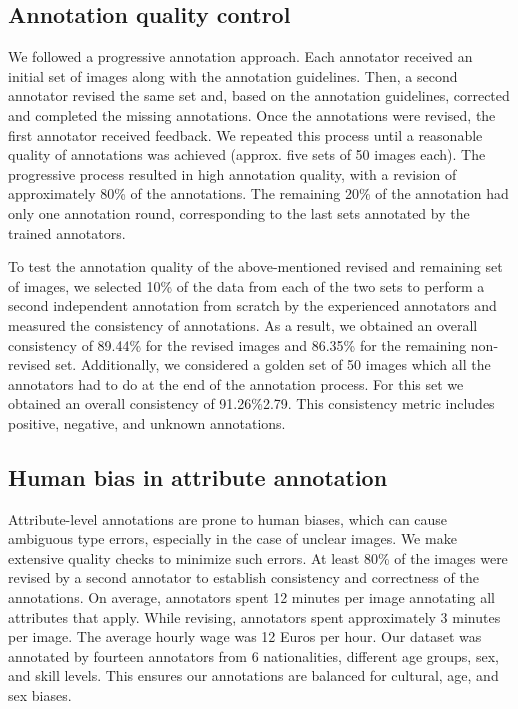 \documentclass[10pt,twocolumn,letterpaper]{article}
\begin{document}
\subsection{Annotation quality control}
We followed a progressive annotation approach. Each annotator received an initial set of images along with the annotation guidelines. Then, a second annotator revised the same set and, based on the annotation guidelines, corrected and completed the missing annotations. Once the annotations were revised, the first annotator received feedback. We repeated this process until a reasonable quality of annotations was achieved (approx. five sets of 50 images each). The progressive process resulted in high annotation quality, with a revision of approximately 80\% of the annotations. The remaining 20\% of the annotation had only one annotation round, corresponding to the last sets annotated by the trained annotators. 

To test the annotation quality of the above-mentioned revised and remaining set of images, we selected 10\% of the data from each of the two sets to perform a second independent annotation from scratch by the experienced annotators and measured the consistency of annotations. As a result, we obtained an overall consistency of 89.44\% for the revised images and 86.35\% for the remaining non-revised set. Additionally, we considered a golden set of 50 images which all the annotators had to do at the end of the annotation process. For this set we obtained an overall consistency of 91.26\%2.79. This consistency metric includes positive, negative, and unknown annotations. 


\subsection{Human bias in attribute annotation} 
Attribute-level annotations are prone to human biases, which can cause ambiguous type errors, especially in the case of unclear images. We make extensive quality checks to minimize such errors. At least 80\% of the images were revised by a second annotator to establish consistency and correctness of the annotations. On average, annotators spent 12 minutes per image annotating all attributes that apply. While revising, annotators spent approximately 3 minutes per image. The average hourly wage was 12 Euros per hour.  
Our dataset was annotated by fourteen annotators from 6 nationalities, different age groups, sex, and skill levels. This ensures our annotations are balanced for cultural, age, and sex biases.
\end{document}
